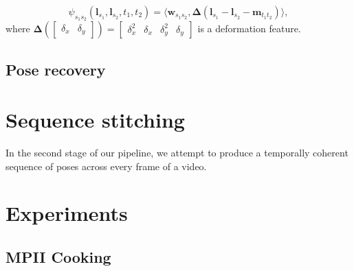 \documentclass{article}
\renewcommand{\vec}{\mathbf}
\begin{document}
\begin{equation}
\label{eqn:pair-cost}
\psi_{s_1 s_2}(\vec l_{s_1}, \vec l_{s_2}, t_1, t_2)
= \langle
    \vec w_{s_1 s_2},
    \vec \Delta(\vec l_{s_1} - \vec l_{s_2}  - \vec m_{t_1 t_2})
\rangle,
\end{equation}
where $\vec \Delta(\begin{bmatrix}\delta_x & \delta_y\end{bmatrix}) =
\begin{bmatrix}\delta_x^2 & \delta_x & \delta_y^2 & \delta_y\end{bmatrix}$ is a
deformation feature.

\subsection{Pose recovery}

\section{Sequence stitching}

%

In the second stage of our pipeline, we attempt to produce a temporally coherent
sequence of poses across every frame of a video. %

\section{Experiments}


\subsection{MPII Cooking}


\end{document}
